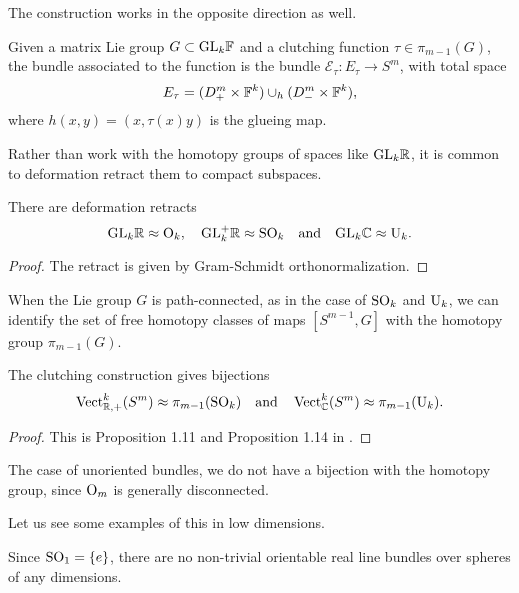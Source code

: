 The construction works in the opposite direction as well.

\begin{definition}
	Given a matrix Lie group $G\subset \mathrm{GL}_k\mathbb{F}$ and a clutching function $\tau\in \pi_{m-1}(G)$, the bundle associated to the function is the bundle $\mathcal{E}_\tau : E_\tau \to S^{m}$, with total space
	\[
		E_\tau = (D_+^m\times \mathbb{F}^k)\cup_h (D_-^{m}\times \mathbb{F}^k),
	\]
	where $h(x,y)=(x,\tau(x)y)$ is the glueing map.
\end{definition}

Rather than work with the homotopy groups of spaces like $\mathrm{GL}_k\mathbb{R}$, it is common to deformation retract them to compact subspaces.

\begin{proposition}
	There are deformation retracts
	\[
		\mathrm{GL}_k\mathbb{R} \approx \mathrm{O}_k,\quad \mathrm{GL}_k^+\mathbb{R} \approx \mathrm{SO}_k\quad\textrm{and}\quad \mathrm{GL}_k\mathbb{C} \approx \mathrm{U}_k.
	\]
\end{proposition}
\begin{proof}
	The retract is given by Gram-Schmidt orthonormalization.
\end{proof}

When the Lie group $G$ is path-connected, as in the case of $\mathrm{SO}_k$ and $\mathrm{U}_k$, we can identify the set of free homotopy classes of maps $[S^{m-1}, G]$ with the homotopy group $\pi_{m-1}(G)$.

\begin{theorem}
	The clutching construction gives bijections
	\[
		\operatorname{Vect}_{\mathbb{R},+}^k(S^m) \approx \pi_{m-1}(\mathrm{SO}_k)\quad\textrm{and}\quad
		\operatorname{Vect}_{\mathbb{C}}^k(S^m) \approx \pi_{m-1}(\mathrm{U}_k).
	\]
\end{theorem}
\begin{proof}
	This is Proposition 1.11 and Proposition 1.14 in \cite{hatcher2003ktheory}.
\end{proof}

\begin{remark}
	The case of unoriented bundles, we do not have a bijection with the homotopy group, since $\mathrm{O}_m$ is generally disconnected.
\end{remark}

Let us see some examples of this in low dimensions.

\begin{example}
	Since $\mathrm{SO}_1 = \{e\}$, there are no non-trivial orientable real line bundles over spheres of any dimensions.
\end{example}

